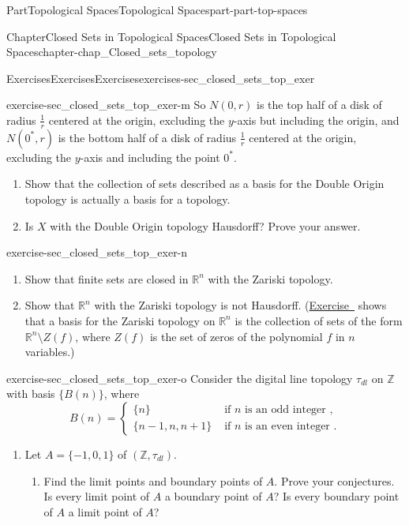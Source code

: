 \documentclass[oneside,10pt,]{book}
\newcommand{\xreffont}{\relax}
\numberwithin{equation}{chapter}
\newcommand{\Z}{\mathbb{Z}}
\newcommand{\R}{\mathbb{R}}
\newcommand{\amp}{&}
\begin{document}
\begin{partptx}{Part}{Topological Spaces}{}{Topological Spaces}{}{}{part-part-top-spaces}
\begin{chapterptx}{Chapter}{Closed Sets in Topological Spaces}{}{Closed Sets in Topological Spaces}{}{}{chapter-chap_Closed_sets_topology}
\begin{exercises-section}{Exercises}{Exercises}{}{Exercises}{}{}{exercises-sec_closed_sets_top_exer}
\begin{divisionexercise}{13}{}{}{exercise-sec_closed_sets_top_exer-m}
So \(N(0,r)\) is the top half of a disk of radius \(\frac{1}{r}\) centered at the origin, excluding the \(y\)-axis but including the origin, and \(N(0^*,r)\) is the bottom half of a disk of radius \(\frac{1}{r}\) centered at the origin, excluding the \(y\)-axis and including the point \(0^*\).%
\begin{enumerate}[font=\bfseries,label=(\alph*),ref=\alph*]%
\item{}Show that the collection of sets described as a basis for the Double Origin topology is actually a basis for a topology.%
\item{}Is \(X\) with the Double Origin topology Hausdorff? Prove your answer.%
\end{enumerate}%
\end{divisionexercise}%
\begin{divisionexercise}{14}{}{}{exercise-sec_closed_sets_top_exer-n}%
\begin{enumerate}[font=\bfseries,label=(\alph*),ref=\alph*]%
\item{}Show that finite sets are closed in \(\R^n\) with the Zariski topology.%
\item{}Show that \(\R^n\) with the Zariski topology is not Hausdorff. (\hyperlink{exercise-ex_TS_Zariski}{Exercise~{\xreffont 12}} shows that a basis for the Zariski topology on \(\R^n\) is the collection of sets of the form \(\R^n \setminus Z(f)\), where \(Z(f)\) is the set of zeros of the polynomial \(f\) in \(n\) variables.)%
\end{enumerate}%
\end{divisionexercise}%
\begin{divisionexercise}{15}{}{}{exercise-sec_closed_sets_top_exer-o}%
Consider the digital line topology \(\tau_{dl}\) on \(\Z\) with basis \(\{B(n)\}\), where%
\begin{equation*}
B(n) = \begin{cases}\{n\}  \amp \text{ if \(n\) is an odd integer } , \\ \{n-1,n,n+1\}  \amp \text{ if \(n\) is an even integer } . \end{cases}
\end{equation*}
%
\begin{enumerate}[font=\bfseries,label=(\alph*),ref=\alph*]%
\item{}Let \(A = \{-1,0,1\}\) of \((\Z, \tau_{dl})\).%
\begin{enumerate}[font=\bfseries,label=(\roman*),ref=\theenumi.\roman*]%
\item{}Find the limit points and boundary points of \(A\). Prove your conjectures. Is every limit point of \(A\) a boundary point of \(A\)? Is every boundary point of \(A\) a limit point of \(A\)?%

\end{enumerate}
\end{enumerate}
\end{divisionexercise}
\end{exercises-section}
\end{chapterptx}
\end{partptx}
\end{document}
